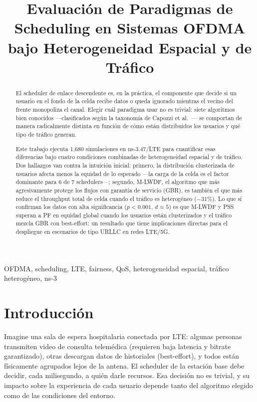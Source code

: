 \documentclass[conference]{IEEEtran}
\title{Evaluación de Paradigmas de Scheduling en Sistemas OFDMA bajo Heterogeneidad Espacial y de Tráfico}
\author{
  \IEEEauthorblockN{Alfonso Pérez García}
  \IEEEauthorblockA{
    Maestría en Ciencias de la Computación\\
    Benemérita Universidad Autónoma de Puebla\\
    Puebla, México\\
    \texttt{alfonso.089911@gmail.com}
  }
}
\begin{document}
\maketitle

\begin{abstract}
El scheduler de enlace descendente es, en la práctica, el componente que decide si
un usuario en el fondo de la celda recibe datos o queda ignorado mientras el vecino
del frente monopoliza el canal. Elegir cuál paradigma usar no es trivial: siete
algoritmos bien conocidos ---clasificados según la taxonomía de Capozzi
et al.~\cite{capozzi2012}--- se comportan de manera radicalmente distinta en función
de cómo están distribuidos los usuarios y qué tipo de tráfico generan.

Este trabajo ejecuta 1{,}680 simulaciones en ns-3.47/LTE para cuantificar esas
diferencias bajo cuatro condiciones combinadas de heterogeneidad espacial y de tráfico.
Dos hallazgos van contra la intuición inicial: primero, la distribución clusterizada
de usuarios afecta menos la equidad de lo esperado ---la carga de la celda es el
factor dominante para 6 de 7 schedulers---; segundo, M-LWDF, el algoritmo que
más agresivamente protege los flujos con garantía de servicio (GBR), es también el
que más reduce el throughput total de celda cuando el tráfico es heterogéneo ($-31\%$).
Lo que sí confirman los datos con alta significancia ($p<0.001$, $d\approx5$) es que
M-LWDF y PSS superan a PF en equidad global cuando los usuarios están clusterizados
y el tráfico mezcla GBR con best-effort: un resultado que tiene implicaciones directas
para el despliegue en escenarios de tipo URLLC en redes LTE/5G.
\end{abstract}

\begin{IEEEkeywords}
OFDMA, scheduling, LTE, fairness, QoS, heterogeneidad espacial, tráfico heterogéneo, ns-3
\end{IEEEkeywords}

\section{Introducción}

Imagine una sala de espera hospitalaria conectada por LTE: algunas personas transmiten
video de consulta telemédica (requieren baja latencia y bitrate garantizado), otras
descargan datos de historiales (best-effort), y todos están físicamente agrupados lejos
de la antena. El scheduler de la estación base debe decidir, cada milisegundo, a quién
darle recursos. Esa decisión no es trivial, y su impacto sobre la experiencia de cada
usuario depende tanto del algoritmo elegido como de las condiciones del entorno.
\end{document}
